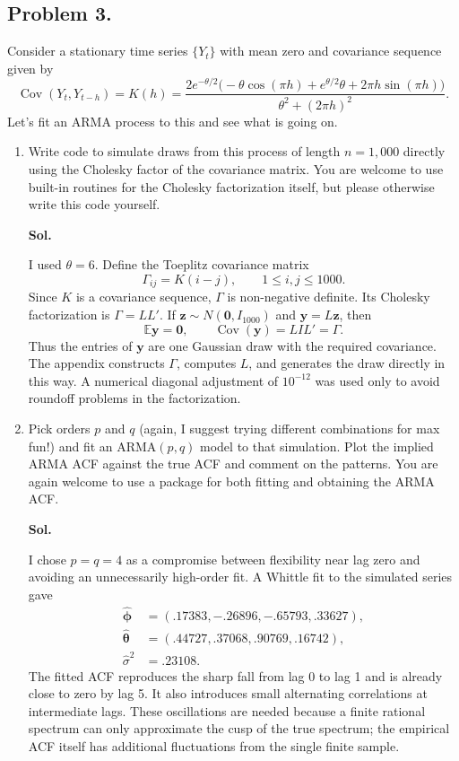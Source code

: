 \documentclass[lang=en,11pt,a4paper,citestyle =authoryear]{elegantpaper}
\begin{document}
\subsection*{Problem 3.}
Consider a stationary time series $\{Y_t\}$ with mean zero and covariance sequence given by
\[
\operatorname{Cov}(Y_t,Y_{t-h})=K(h)
=\frac{2e^{-\theta/2}\bigl(-\theta\cos(\pi h)+e^{\theta/2}\theta+2\pi h\sin(\pi h)\bigr)}{\theta^2+(2\pi h)^2}.
\]
Let's fit an ARMA process to this and see what is going on.
\begin{enumerate}[label=\arabic*.,leftmargin=*]
\item Write code to simulate draws from this process of length $n=1{,}000$ directly using the Cholesky factor of the covariance matrix. You are welcome to use built-in routines for the Cholesky factorization itself, but please otherwise write this code yourself.
\par\vspace{0.5em}\textbf{Sol.}\par
I used $\theta=6$. Define the Toeplitz covariance matrix
\[
\Gamma_{ij}=K(i-j),\qquad 1\leq i,j\leq 1000.
\]
Since $K$ is a covariance sequence, $\Gamma$ is non-negative definite. Its
Cholesky factorization is $\Gamma=LL'$. If
$\mathbf z\sim N(\mathbf0,I_{1000})$ and $\mathbf y=L\mathbf z$, then
\[
\mathbb E\mathbf y=\mathbf0,
\qquad
\operatorname{Cov}(\mathbf y)=LIL'=\Gamma.
\]
Thus the entries of $\mathbf y$ are one Gaussian draw with the required
covariance. The appendix constructs $\Gamma$, computes $L$, and generates the
draw directly in this way. A numerical diagonal adjustment of $10^{-12}$ was
used only to avoid roundoff problems in the factorization.
\vspace{1em}

\item Pick orders $p$ and $q$ (again, I suggest trying different combinations for max fun!) and fit an ARMA$(p,q)$ model to that simulation. Plot the implied ARMA ACF against the true ACF and comment on the patterns. You are again welcome to use a package for both fitting and obtaining the ARMA ACF.
\par\vspace{0.5em}\textbf{Sol.}\par
I chose $p=q=4$ as a compromise between flexibility near lag zero and avoiding
an unnecessarily high-order fit. A Whittle fit to the simulated series gave
\begin{align*}
\widehat{\boldsymbol\phi}
&=(.17383,-.26896,-.65793,.33627),\\
\widehat{\boldsymbol\theta}
&=(.44727,.37068,.90769,.16742),\\
\widehat\sigma^2&=.23108.
\end{align*}
The fitted ACF reproduces the sharp fall from lag 0 to lag 1 and is already
close to zero by lag 5. It also introduces small alternating correlations at
intermediate lags. These oscillations are needed because a finite rational
spectrum can only approximate the cusp of the true spectrum; the empirical
ACF itself has additional fluctuations from the single finite sample.


\end{enumerate}
\end{document}
